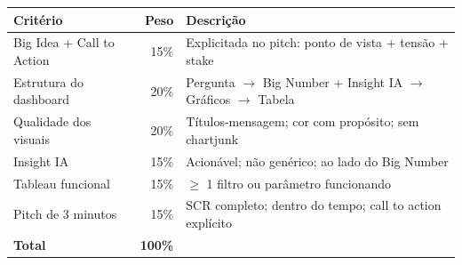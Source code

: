 \begin{tabular}{|p{4.5cm}|r|p{7.5cm}|}
\hline
\textbf{Critério} & \textbf{Peso} & \textbf{Descrição} \\
\hline
Big Idea + Call to Action & 15\% & Explicitada no pitch: ponto de vista + tensão + stake \\
Estrutura do dashboard   & 20\% & Pergunta $\to$ Big Number + Insight IA $\to$ Gráficos $\to$ Tabela \\
Qualidade dos visuais    & 20\% & Títulos-mensagem; cor com propósito; sem chartjunk \\
Insight IA               & 15\% & Acionável; não genérico; ao lado do Big Number \\
Tableau funcional        & 15\% & $\geq$ 1 filtro ou parâmetro funcionando \\
Pitch de 3 minutos       & 15\% & SCR completo; dentro do tempo; call to action explícito \\
\hline
\textbf{Total}           & \textbf{100\%} & \\
\hline
\end{tabular}
